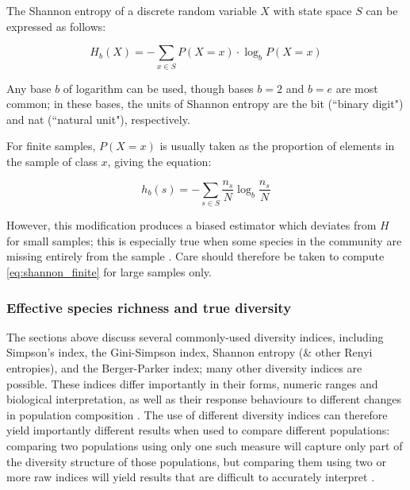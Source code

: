 The Shannon entropy of a discrete random variable $X$ with state space $S$ can be expressed as follows:

\begin{equation}
H_b(X) = -\sum_{x \in S} P(X=x) \cdot \log_b P(X=x)
\label{eq:shannon_infinite}
\end{equation}

Any base $b$ of logarithm can be used, though bases $b=2$ and $b=e$ are most common; in these bases, the units of Shannon entropy are the bit (``binary digit") and nat (``natural unit"), respectively. 

For finite samples, $P(X=x)$ is usually taken as the proportion of elements in the sample of class $x$, giving the equation:

\begin{equation}
h_b(s) = -\sum_{s \in S} \frac{n_s}{N} \log_b \frac{n_s}{N}
\label{eq:shannon_finite}
\end{equation}


However, this modification produces a biased estimator which deviates from $H$ for small samples; this is especially true when some species in the community are missing entirely from the sample \citep{peet1974diversity}. Care should therefore be taken to compute \autoref{eq:shannon_finite} for large samples only. %

\subsubsection{Effective species richness and true diversity} %
\label{sec:hill}

The sections above discuss several commonly-used diversity indices, including Simpson's index, the Gini-Simpson index, Shannon entropy (\& other Renyi entropies), and the Berger-Parker index; many other diversity indices are possible. These indices differ importantly in their forms, numeric ranges and biological interpretation, as well as their response behaviours to different changes in population composition \citep{peet1974diversity, jost2006entropy}. The use of different diversity indices can therefore yield importantly different results when used to compare different populations: comparing two populations using only one such measure will capture only part of the diversity structure of those populations, but comparing them using two or more raw indices will yield results that are difficult to accurately interpret \citep{peet1974diversity, jost2006entropy}.

